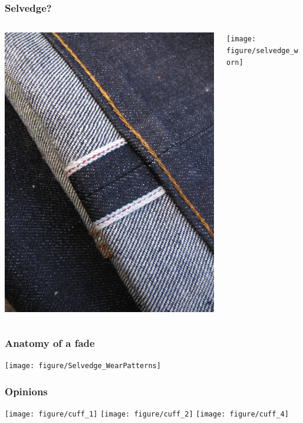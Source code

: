 \documentclass{beamer}
\begin{document}
\begin{frame}
  \frametitle{Selvedge?}
  \begin{columns}
    \begin{column}{0.5\textwidth}
      \includegraphics[height = 0.8\textheight, width = \textwidth, keepaspectratio = true]{figure/selvedge_exp}
    \end{column}
    \begin{column}{0.5\textwidth}
      \texttt{[image: figure/selvedge\_worn]}
    \end{column}
  \end{columns}
\end{frame}

\begin{frame}
  \frametitle{Anatomy of a fade}

  \texttt{[image: figure/Selvedge\_WearPatterns]}
\end{frame}

\begin{frame}
  \frametitle{Opinions}
  \begin{center}
    \texttt{[image: figure/cuff\_1]}
    \texttt{[image: figure/cuff\_2]}
    \texttt{[image: figure/cuff\_4]}
  \end{center}
\end{frame}
\end{document}
